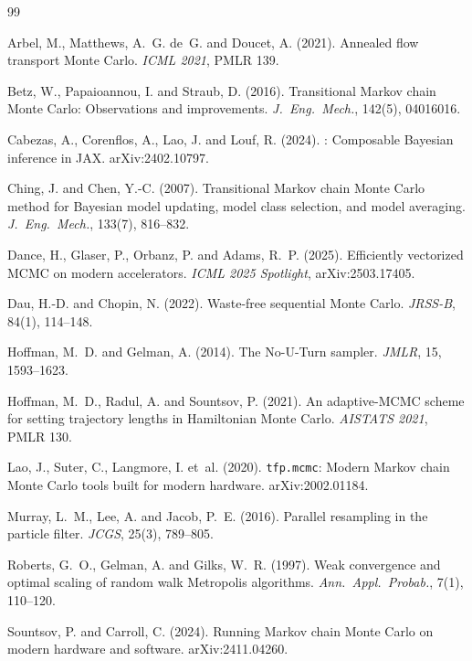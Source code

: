 \documentclass[11pt,a4paper]{article}
\begin{document}
\begin{thebibliography}{99}

Arbel, M., Matthews, A.~G. de~G. and Doucet, A. (2021).
\newblock Annealed flow transport Monte Carlo.
\newblock \emph{ICML 2021}, PMLR 139.

Betz, W., Papaioannou, I. and Straub, D. (2016).
\newblock Transitional Markov chain Monte Carlo: Observations and improvements.
\newblock \emph{J.~Eng.~Mech.}, 142(5), 04016016.

Cabezas, A., Corenflos, A., Lao, J. and Louf, R. (2024).
: Composable {B}ayesian inference in {JAX}.
\newblock arXiv:2402.10797.

Ching, J. and Chen, Y.-C. (2007).
\newblock Transitional {M}arkov chain {M}onte {C}arlo method for {B}ayesian
  model updating, model class selection, and model averaging.
\newblock \emph{J.~Eng.~Mech.}, 133(7), 816--832.

Dance, H., Glaser, P., Orbanz, P. and Adams, R.~P. (2025).
\newblock Efficiently vectorized {MCMC} on modern accelerators.
\newblock \emph{ICML 2025 Spotlight}, arXiv:2503.17405.

Dau, H.-D. and Chopin, N. (2022).
\newblock Waste-free sequential {M}onte {C}arlo.
\newblock \emph{JRSS-B}, 84(1), 114--148.

Hoffman, M.~D. and Gelman, A. (2014).
\newblock The {N}o-{U}-{T}urn sampler.
\newblock \emph{JMLR}, 15, 1593--1623.

Hoffman, M.~D., Radul, A. and Sountsov, P. (2021).
\newblock An adaptive-{MCMC} scheme for setting trajectory lengths in
  {H}amiltonian {M}onte {C}arlo.
\newblock \emph{AISTATS 2021}, PMLR 130.

Lao, J., Suter, C., Langmore, I. et~al. (2020).
\newblock \texttt{tfp.mcmc}: Modern {M}arkov chain {M}onte {C}arlo tools built
  for modern hardware.
\newblock arXiv:2002.01184.

Murray, L.~M., Lee, A. and Jacob, P.~E. (2016).
\newblock Parallel resampling in the particle filter.
\newblock \emph{JCGS}, 25(3), 789--805.

Roberts, G.~O., Gelman, A. and Gilks, W.~R. (1997).
\newblock Weak convergence and optimal scaling of random walk {M}etropolis
  algorithms.
\newblock \emph{Ann.~Appl.~Probab.}, 7(1), 110--120.

Sountsov, P. and Carroll, C. (2024).
\newblock Running {M}arkov chain {M}onte {C}arlo on modern hardware and software.
\newblock arXiv:2411.04260.

\end{thebibliography}
\end{document}
